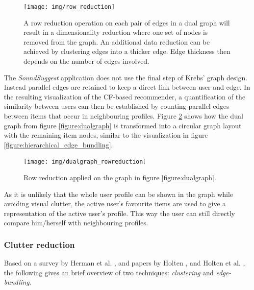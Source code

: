 \begin{figure}%
	\begin{center}
		\texttt{[image: img/row\_reduction]}%
	\end{center}
	\caption{A row reduction operation on each pair of edges in a dual graph will result in a dimensionality reduction where one set of nodes is removed from the graph. An additional data reduction can be achieved by clustering edges into a thicker edge. Edge thickness then depends on the number of edges involved.}%
	\label{figure:rowreduction}%
\end{figure}

The \emph{SoundSuggest} application does not use the final step of Krebs' graph design. Instead parallel edges are retained to keep a direct link between user and edge. In the resulting visualization of the CF-based recommender, a quantification of the similarity between users can then be established by counting parallel edges between items that occur in neighbouring profiles. Figure \ref{figure:rowreduction_dualgraph} shows how the dual graph from figure \ref{figure:dualgraph} is transformed into a circular graph layout with the remaining item nodes, similar to the visualization in figure \ref{figure:hierarchical_edge_bundling}.

\begin{figure}%
	\begin{center}
		\texttt{[image: img/dualgraph\_rowreduction]}%
	\end{center}
	\caption{Row reduction applied on the graph in figure \ref{figure:dualgraph}.}%
	\label{figure:rowreduction_dualgraph}%
\end{figure}

As it is unlikely that the whole user profile can be shown in the graph while avoiding visual clutter, the active user's favourite items are used to give a representation of the active user's profile. This way the user can still directly compare him/herself with neighbouring profiles.


\subsubsection{Clutter reduction}

Based on a survey by Herman et al. \cite{herman:2000}, and papers by Holten \cite{Holten:2006:HEB:1187627.1187772}, and Holten et al. \cite{holten:2009}, the following gives an brief overview of two techniques: \emph{clustering} and \emph{edge-bundling}.

